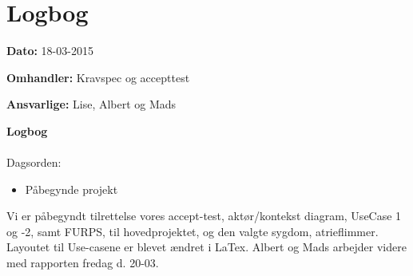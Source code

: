 \chapter{Logbog}

\textbf{Dato:} 18-03-2015

\textbf{Omhandler:}  Kravspec og accepttest 

\textbf{Ansvarlige:} Lise, Albert og Mads
 
\textbf{Logbog}
\\
\\
Dagsorden:
\begin{itemize}
	\item Påbegynde projekt
\end{itemize}

Vi er påbegyndt tilrettelse vores accept-test, aktør/kontekst diagram, UseCase 1 og -2, samt FURPS, til hovedprojektet, og den valgte sygdom, atrieflimmer. Layoutet til Use-casene er blevet ændret i LaTex. Albert og Mads arbejder videre med rapporten fredag d. 20-03.